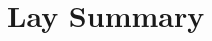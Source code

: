\thispagestyle{empty}

\vspace*{\fill}

\section*{Lay Summary}

\newpage{}\thispagestyle{empty}

\emptypage

